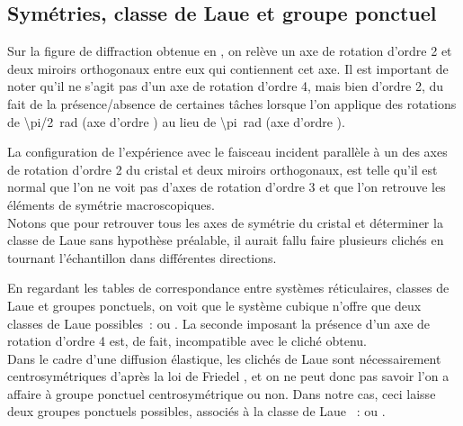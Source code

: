 \begin{table}
\caption{Mesures d'écart par rapport à la symétrie attendue et calcul de l'erreur d'alignement angulaire du cristal par rapport à l'axe de haute symétrie proche.}
\label{tab:LaueAngleError}
\end{table}

\subsection{Symétries, classe de Laue et groupe ponctuel}

Sur la figure de diffraction obtenue en , on relève un axe de rotation d'ordre 2 et deux miroirs orthogonaux entre eux qui contiennent cet axe.
Il est important de noter qu'il ne s'agit pas d'un axe de rotation d'ordre 4, mais bien d'ordre 2, du fait de la présence/absence de certaines tâches lorsque l'on applique des rotations de \SI{\pi/2}{\radian} (axe d'ordre ) au lieu de \SI{\pi}{\radian} (axe d'ordre ).

La configuration de l'expérience avec le faisceau incident parallèle à un des axes de rotation d'ordre 2 du cristal et deux miroirs orthogonaux, est telle qu'il est normal que l'on ne voit pas d'axes de rotation d'ordre 3 et que l'on retrouve les éléments de symétrie macroscopiques\cite{JJRousseau2007}.\\
Notons que pour retrouver tous les axes de symétrie du cristal et déterminer la classe de Laue sans hypothèse préalable, il aurait fallu faire plusieurs clichés en tournant l'échantillon dans différentes directions.

En regardant les tables de correspondance entre systèmes réticulaires, classes de Laue et groupes ponctuels\cite{JJRousseau2007,ShmueliIUCr2016}, on voit que le système cubique n'offre que deux classes de Laue possibles~:  ou .
La seconde imposant la présence d'un axe de rotation d'ordre 4 est, de fait, incompatible avec le cliché obtenu.\\
Dans le cadre d'une diffusion élastique, les clichés de Laue sont nécessairement centrosymétriques d'après la loi de Friedel \cite{}, et on ne peut donc pas savoir l'on a affaire à groupe ponctuel centrosymétrique ou non. Dans notre cas, ceci laisse deux groupes ponctuels possibles, associés à la classe de Laue ~:  ou .

